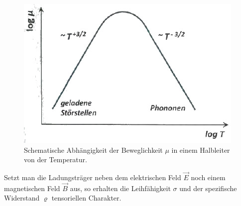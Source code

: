 \documentclass[a4paper,12pt]{article}
\begin{document}
\begin{figure}[h!]
\centering
\includegraphics[scale=0.9]{Mu_temp_dep.jpeg}
\caption{Schematische Abhängigkeit der Beweglichkeit $\mu$ in einem Halbleiter von der Temperatur. \cite{lit:GroMa14}}
\label{fig:mu-temp_dep}
\end{figure}
Setzt man die Ladungsträger neben dem elektrischen Feld $\vec{E}$ noch einem magnetischen Feld $\vec{B}$ aus, so erhalten die Leihfähigkeit $\sigma$ und der spezifische Widerstand $\varrho$ tensoriellen Charakter.
\end{document}
